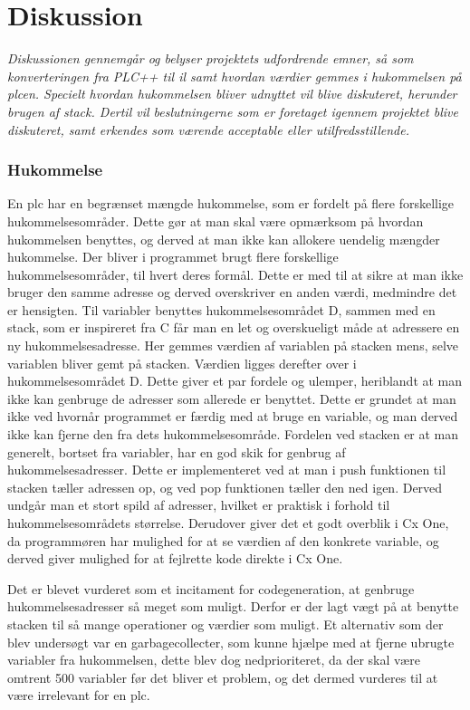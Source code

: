 \chapter{Diskussion}\label{sec:Diskussion}
\textit{Diskussionen gennemgår og belyser projektets udfordrende emner, så som konverteringen fra PLC++ til \gls{il} samt hvordan værdier gemmes i hukommelsen på \gls{plc}en.
Specielt hvordan hukommelsen bliver udnyttet vil blive diskuteret, herunder brugen af stack. 
Dertil vil beslutningerne som er foretaget igennem projektet blive diskuteret, samt erkendes som værende acceptable eller utilfredsstillende.}

\subsection*{Hukommelse}
En \gls{plc} har en begrænset mængde hukommelse, som er fordelt på flere forskellige hukommelsesområder.
Dette gør at man skal være opmærksom på hvordan hukommelsen benyttes, og derved at man ikke kan allokere uendelig mængder hukommelse.
Der bliver i programmet brugt flere forskellige hukommelsesområder, til hvert deres formål. Dette er med til at sikre at man ikke bruger den samme adresse og derved overskriver en anden værdi, medmindre det er hensigten.
Til variabler benyttes hukommelsesområdet D, sammen med en stack, som er inspireret fra C får man en let og overskueligt måde at adressere en ny hukommelsesadresse.
Her gemmes værdien af variablen på stacken mens, selve variablen bliver gemt på stacken.
Værdien ligges derefter over i hukommelsesområdet D.
Dette giver et par fordele og ulemper, heriblandt at man ikke kan genbruge de adresser som allerede er benyttet. Dette er grundet at man ikke ved hvornår programmet er færdig med at bruge en variable, og man derved ikke kan fjerne den fra dets hukommelsesområde.
Fordelen ved stacken er at man generelt, bortset fra variabler, har en god skik for genbrug af hukommelsesadresser.
Dette er implementeret ved at man i push funktionen til stacken tæller adressen op, og ved pop funktionen tæller den ned igen. Derved undgår man et stort spild af adresser, hvilket er praktisk i forhold til hukommelsesområdets størrelse.
Derudover giver det et godt overblik i Cx One, da programmøren har mulighed for at se værdien af den konkrete variable, og derved giver mulighed for at fejlrette kode direkte i Cx One.

Det er blevet vurderet som et incitament for codegeneration, at genbruge hukommelsesadresser så meget som muligt. Derfor er der lagt vægt på at benytte stacken til så mange operationer og værdier som muligt.
Et alternativ som der blev undersøgt var en garbagecollecter, som kunne hjælpe med at fjerne ubrugte variabler fra hukommelsen, dette blev dog nedprioriteret, da der skal være omtrent 500 variabler før det bliver et problem, og det dermed vurderes til at være irrelevant for en \gls{plc}.

